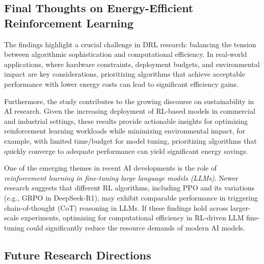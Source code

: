 \subsection{Final Thoughts on Energy-Efficient Reinforcement Learning}
\label{subsec:final_thoughts_energy_eff}
The findings highlight a crucial challenge in DRL research: balancing the tension between algorithmic sophistication and computational efficiency. In real-world applications, where hardware constraints, deployment budgets, and environmental impact are key considerations, prioritizing algorithms that achieve acceptable performance with lower energy costs can lead to significant efficiency gains.

Furthermore, the study contributes to the growing discourse on sustainability in AI research. Given the increasing deployment of RL-based models in commercial and industrial settings, these results provide actionable insights for optimizing reinforcement learning workloads while minimizing environmental impact, for example, with limited time/budget for model tuning, prioritizing algorithms that quickly converge to adequate performance can yield significant energy savings.

One of the emerging themes in recent AI developments is the role of \emph{reinforcement learning in fine-tuning large language models (LLMs)}. Newer research suggests that different RL algorithms, including PPO and its variations (e.g., GRPO in DeepSeek-R1), may exhibit comparable performance in triggering chain-of-thought (CoT) reasoning in LLMs. If these findings hold across larger-scale experiments, optimizing for computational efficiency in RL-driven LLM fine-tuning could significantly reduce the resource demands of modern AI models.

\subsection{Future Research Directions}
\label{subsec:future_research}


